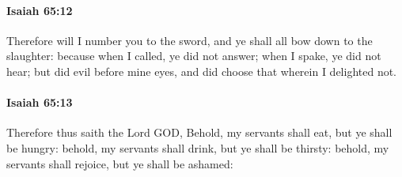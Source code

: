 		\paragraph{Isaiah 65:12} %
			\label{ISAIAH-65-12}

			Therefore will I number you to the sword, and ye shall all bow down to the slaughter: because when I called, ye did not answer; when I spake, ye did not hear; but did evil before mine eyes, and did choose that wherein I delighted not.


		\paragraph{Isaiah 65:13} %
			\label{ISAIAH-65-13}

			Therefore thus saith the Lord GOD, Behold, my servants shall eat, but ye shall be hungry: behold, my servants shall drink, but ye shall be thirsty: behold, my servants shall rejoice, but ye shall be ashamed:

